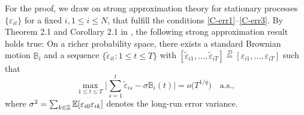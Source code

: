 \documentclass[a4paper,12pt]{article}
\numberwithin{equation}{section}
\begin{document}
For the proof, we draw on strong approximation theory for stationary processes $\{\varepsilon_{it}\}$ for a fixed $i, 1\le i \le N$, that fulfill the conditions \ref{C-err1}--\ref{C-err3}. By Theorem 2.1 and Corollary 2.1 in \cite{BerkesLiuWu2014}, the following strong approximation result holds true: On a richer probability space, there exists a standard Brownian motion $\mathbb{B}_i$ and a sequence $\{ \widetilde{\varepsilon}_{it}: 1 \le t \le T \}$ with $[\widetilde{\varepsilon}_{i1},\ldots,\widetilde{\varepsilon}_{iT}] \stackrel{\mathcal{D}}{=} [\varepsilon_{i1},\ldots,\varepsilon_{iT}]$ such that 
\begin{equation}\label{eq-strongapprox-equality-dep}
\max_{1 \le t \le T} \Big| \sum\limits_{s=1}^t \widetilde{\varepsilon}_{is} - \sigma \mathbb{B}_i(t) \Big| = o\big( T^{1/q} \big) \quad \text{a.s.},  
\end{equation}
where $\sigma^2 = \sum_{k \in \mathbb{Z}} \mathbb{E}[\varepsilon_{i0} \varepsilon_{ik}]$ denotes the long-run error variance.
\end{document}
